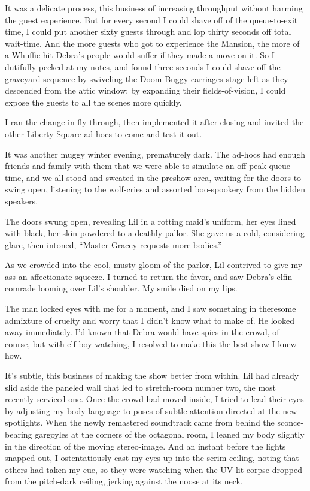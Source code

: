 It was a delicate process, this business of increasing throughput
without harming the guest experience. But for every second I could
shave off of the queue-to-exit time, I could put another sixty
guests through and lop thirty seconds off total wait-time. And the
more guests who got to experience the Mansion, the more of a
Whuffie-hit Debra's people would suffer if they made a move on it.
So I dutifully pecked at my notes, and found three seconds I could
shave off the graveyard sequence by swiveling the Doom Buggy
carriages stage-left as they descended from the attic window: by
expanding their fields-of-vision, I could expose the guests to all
the scenes more quickly.

I ran the change in fly-through, then implemented it after closing
and invited the other Liberty Square ad-hocs to come and test it
out.

It was another muggy winter evening, prematurely dark. The ad-hocs
had enough friends and family with them that we were able to
simulate an off-peak queue-time, and we all stood and sweated in
the preshow area, waiting for the doors to swing open, listening to
the wolf-cries and assorted boo-spookery from the hidden speakers.

The doors swung open, revealing Lil in a rotting maid's uniform,
her eyes lined with black, her skin powdered to a deathly pallor.
She gave us a cold, considering glare, then intoned, “Master Gracey
requests more bodies.”

As we crowded into the cool, musty gloom of the parlor, Lil
contrived to give my ass an affectionate squeeze. I turned to
return the favor, and saw Debra's elfin comrade looming over Lil's
shoulder. My smile died on my lips.

The man locked eyes with me for a moment, and I saw something in
there{\dash}some admixture of cruelty and worry that I didn't know what
to make of. He looked away immediately. I'd known that Debra would
have spies in the crowd, of course, but with elf-boy watching, I
resolved to make this the best show I knew how.

It's subtle, this business of making the show better from within.
Lil had already slid aside the paneled wall that led to
stretch-room number two, the most recently serviced one. Once the
crowd had moved inside, I tried to lead their eyes by adjusting my
body language to poses of subtle attention directed at the new
spotlights. When the newly remastered soundtrack came from behind
the sconce-bearing gargoyles at the corners of the octagonal room,
I leaned my body slightly in the direction of the moving
stereo-image. And an instant before the lights snapped out, I
ostentatiously cast my eyes up into the scrim ceiling, noting that
others had taken my cue, so they were watching when the UV-lit
corpse dropped from the pitch-dark ceiling, jerking against the
noose at its neck.

